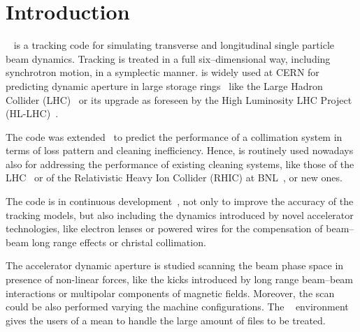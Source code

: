 \chapter{Introduction} \label{Intro}
\SIXTRACK{}~\cite{SixTrack_user_manual,SixPub,sixtrackWeb} is a tracking
code for simulating transverse and longitudinal single particle beam dynamics.
Tracking is treated in a full six--dimensional way, including synchrotron
motion, in a symplectic manner. \SIXTRACK{} is widely used at CERN for
predicting dynamic aperture in large storage
rings~\cite{DynApeStudiesGiovannozzi2015} like the Large Hadron Collider
(LHC)~\cite{NomLHCdesignRepoV1} or its upgrade as foreseen by the
High Luminosity LHC Project (HL-LHC)~\cite{HLLHC_book,HLLHCtechDesRepo}.

The code was extended~\cite{SixTrackForCollimation} to predict the
performance of a collimation system in terms of loss pattern and cleaning
inefficiency. Hence, \SIXTRACK{} is routinely used nowadays also
for addressing the performance of existing cleaning systems,
like those of the LHC~\cite{LHCCollSys} or of the Relativistic
Heavy Ion Collider (RHIC) at BNL~\cite{RHICcollSys}, or new ones.

The code is in continuous development~\cite{HLLHCTrackWS,Amereghe6TColl},
not only to improve the accuracy of the tracking models, but also including
the dynamics introduced by novel accelerator technologies, like electron
lenses or powered wires for the compensation of beam--beam long range effects
or christal collimation.

The accelerator dynamic aperture is studied scanning
the beam phase space in presence of non-linear forces, like the kicks
introduced by long range beam--beam interactions or multipolar components
of magnetic fields. Moreover, the scan could be also performed varying
the machine configurations. The
\SIXDESK{}~\cite{SixDesk_original,SixDesk_updated} environment gives the
users of \SIXTRACK{} a mean to handle the large amount of files to be treated.

